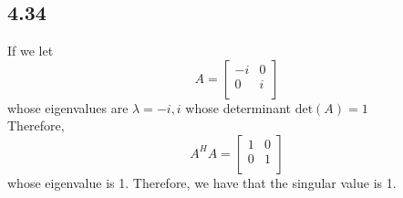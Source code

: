 \documentclass[letterpaper,12pt]{article}
\theoremstyle{definition}
\begin{document}
\subsection*{4.34}


If we let 
\[A = \begin{bmatrix}-i & 0 \\
                0 & i \\
\end{bmatrix}\]
whose eigenvalues are $\lambda = -i, i$ whose determinant $\text{det}(A) = 1$\\
Therefore, \[A^HA = \begin{bmatrix}1 & 0 \\
                0 & 1 \\
\end{bmatrix}\]
whose eigenvalue is 1. Therefore, we have that the singular value is 1. 
\end{document}
